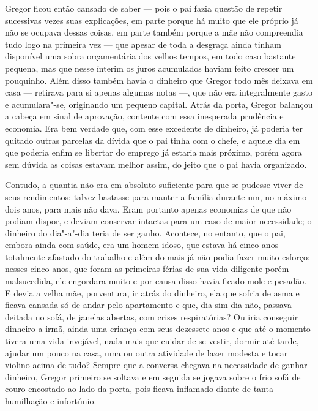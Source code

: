 Gregor ficou então cansado de saber --- pois o pai fazia questão de repetir
sucessivas vezes suas explicações, em parte porque há muito que ele
próprio já não se ocupava dessas coisas, em parte também porque a mãe não
compreendia tudo logo na primeira vez --- que apesar de toda a desgraça
ainda tinham disponível uma sobra orçamentária dos velhos tempos, em todo
caso bastante pequena, mas que nesse ínterim os juros acumulados haviam
feito crescer um pouquinho. Além disso também havia o dinheiro que Gregor
todo mês deixava em casa --- retirava para si apenas algumas notas ---, que
não era integralmente gasto e acumulara"-se, originando um pequeno capital.
Atrás da porta, Gregor balançou a cabeça em sinal de aprovação, contente
com essa inesperada prudência e economia. Era bem verdade que, com esse
excedente de dinheiro, já poderia ter quitado outras parcelas da dívida
que o pai tinha com o chefe, e aquele dia em que poderia enfim se libertar
do emprego já estaria mais próximo, porém agora sem dúvida as coisas
estavam melhor assim, do jeito que o pai havia organizado.

Contudo, a quantia não era em absoluto suficiente para que se pudesse
viver de seus rendimentos; talvez bastasse para manter a família durante
um, no máximo dois anos, para mais não dava. Eram portanto apenas
economias de que não podiam dispor, e deviam conservar intactas para um
caso de maior necessidade; o dinheiro do dia"-a"-dia teria de ser ganho.
Acontece, no entanto, que o pai, embora ainda com saúde, era um homem
idoso, que estava há cinco anos totalmente afastado do trabalho e além do
mais já não podia fazer muito esforço; nesses cinco anos, que foram as
primeiras férias de sua vida diligente porém malsucedida, ele engordara
muito e por causa disso havia ficado mole e pesadão. E devia a velha mãe,
porventura, ir atrás do dinheiro, ela que sofria de asma e ficava cansada
só de andar pelo apartamento e que, dia sim dia não, passava deitada no
sofá, de janelas abertas, com crises respiratórias? Ou iria conseguir
dinheiro a irmã, ainda uma criança com seus dezessete anos e que até o
momento tivera uma vida invejável, nada mais que cuidar de se vestir,
dormir até tarde, ajudar um pouco na casa, uma ou outra atividade de lazer
modesta e tocar violino acima de tudo? Sempre que a conversa chegava na
necessidade de ganhar dinheiro, Gregor primeiro se soltava e em seguida se
jogava sobre o frio sofá de couro encostado ao lado da porta, pois ficava
inflamado diante de tanta humilhação e infortúnio.

